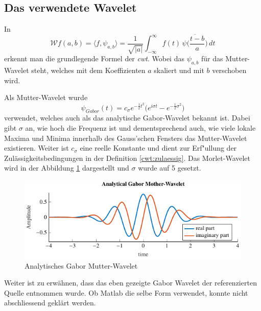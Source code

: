 \begin{refsection}
\subsection{Das verwendete Wavelet}
In
\begin{equation}
\mathcal{W}f (a,b)
=
\langle f,\psi_{a,b}\rangle
=
\frac{1}{\sqrt{|a|}}\int_{-\infty}^\infty f(t)\,\overline{
	\psi\biggl(\frac{t-b}{a}\biggr)}\,dt
\label{eq:cwt1}
\end{equation}
erkennt man die grundlegende Formel der \textit{cwt}.
Wobei das $\psi_{a,b}$ für das Mutter-Wavelet steht, welches mit dem Koeffizienten $a$ skaliert und mit $b$ verschoben wird.

Als Mutter-Wavelet wurde 
\begin{equation}
\psi_{Gabor}(t) =  c_{\sigma} e^{-\frac{1}{2}t^2} \biggl(e^{i \sigma t}- e^{-\frac{1}{2} \sigma^2} \biggr)
\label{eq:morlet}
\end{equation} \cite{online:Morlet}
verwendet, welches auch als das analytische Gabor-Wavelet bekannt ist.
Dabei gibt $\sigma$ an, wie hoch die Frequenz ist und dementsprechend auch, wie viele lokale Maxima und Minima innerhalb des Gauss'schen Fensters das Mutter-Wavelet existieren.
Weiter ist $c_{\sigma}$ eine reelle Konstante und dient zur Erf"ullung der Zulässigkeitsbedingungen in der Definition \ref{cwt:zulaessig}.
Das Morlet-Wavelet wird in der Abbildung \ref{fig:gabor_plot} \space dargestellt und $\sigma$ wurde auf 5 gesetzt.

\begin{figure}[h]
\centering
\includegraphics[width=1\textwidth]{papers/wwt/images/gabor.pdf}
\caption{Analytisches Gabor Mutter-Wavelet}
\label{fig:gabor_plot}
\end{figure}

Weiter ist zu erwähnen, dass das eben gezeigte Gabor Wavelet der referenzierten Quelle entnommen wurde. Ob Matlab die selbe Form verwendet, konnte nicht abschliessend geklärt werden.


\end{refsection}
